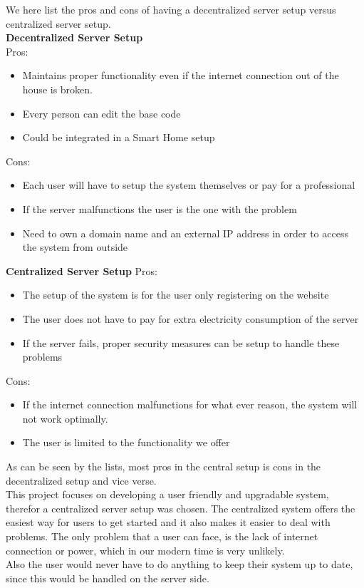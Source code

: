 We here list the pros and cons of having a decentralized server setup versus centralized server setup.\\

\textbf{Decentralized Server Setup}\\
Pros:
\begin{itemize}
	\item Maintains proper functionality even if the internet connection out of the house is broken.
  \item Every person can edit the base code
  \item Could be integrated in a Smart Home setup
\end{itemize}

Cons:
\begin{itemize}
	\item Each user will have to setup the system themselves or pay for a professional
  \item If the server malfunctions the user is the one with the problem
  \item Need to own a domain name and an external IP address in order to access the system from outside
\end{itemize}

\textbf{Centralized Server Setup}
Pros:
\begin{itemize}
	\item The setup of the system is for the user only registering on the website
	\item The user does not have to pay for extra electricity consumption of the server
	\item If the server fails, proper security measures can be setup to handle these problems
\end{itemize}

Cons:
\begin{itemize}
	\item If the internet connection malfunctions for what ever reason, the system will not work optimally.
  \item The user is limited to the functionality we offer
\end{itemize}

As can be seen by the lists, most pros in the central setup is cons in the decentralized setup and vice verse.\\
This project focuses on developing a user friendly and upgradable system, therefor a centralized server setup was chosen. The centralized system offers the easiest way for users to get started and it also makes it easier to deal with problems. The only problem that a user can face, is the lack of internet connection or power, which in our modern time is very unlikely.\\
Also the user would never have to do anything to keep their system up to date, since this would be handled on the server side.
